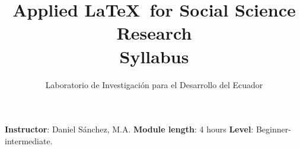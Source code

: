 \documentclass[a4paper,12pt]{article}
\title{Applied \LaTeX \ for Social Science Research \\[1ex] \large{Syllabus}}
\date{Laboratorio de Investigación para el Desarrollo del Ecuador}
\begin{document}
\maketitle

\textbf{Instructor}: Daniel Sánchez, M.A.
\textbf{Module length}: 4 hours
\textbf{Level}: Beginner-intermediate.



\end{document}
